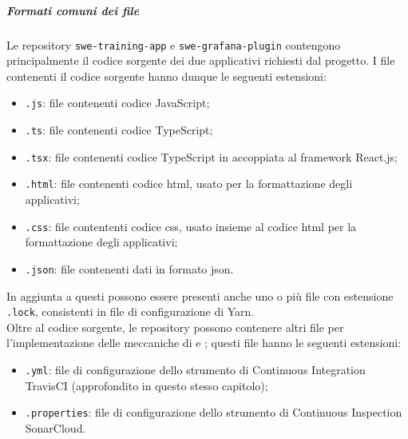 \documentclass[../norme-di-progetto.tex]{subfiles}
\begin{document}
\subparagraph*{Formati comuni dei file}
Le repository \texttt{swe-training-app} e \texttt{swe-grafana-plugin} contengono principalmente il codice sorgente dei due applicativi richiesti dal progetto. I file contenenti il codice sorgente hanno dunque le seguenti estensioni:
\begin{itemize}
  \item \texttt{.js}: file contenenti codice JavaScript;
  \item \texttt{.ts}: file contenenti codice TypeScript;
  \item \texttt{.tsx}: file contenenti codice TypeScript in accoppiata al framework React.js;
  \item \texttt{.html}: file contenenti codice html, usato per la formattazione degli applicativi;
  \item \texttt{.css}: file contententi codice css, usato insieme al codice html per la formattazione degli applicativi;
  \item \texttt{.json}: file contenenti dati in formato json.
\end{itemize}
In aggiunta a questi possono essere presenti anche uno o più file con estensione \texttt{.lock}, consistenti in file di configurazione di Yarn. \\
Oltre al codice sorgente, le repository possono contenere altri file per l'implementazione delle meccaniche di  e ; questi file hanno le seguenti estensioni:
\begin{itemize}
  \item \texttt{.yml}: file di configurazione dello strumento di Continuous Integration TravisCI (approfondito in questo stesso capitolo);
  \item \texttt{.properties}: file di configurazione dello strumento di Continuous Inspection SonarCloud.
\end{itemize}
\end{document}
